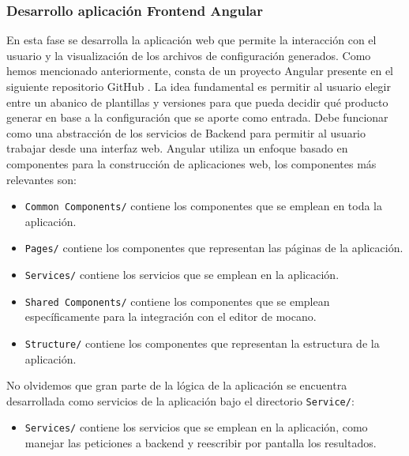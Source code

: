 \documentclass[12pt, a4paper, twoside]{article}
\begin{document}
\subsubsection{Desarrollo aplicación Frontend Angular}
En esta fase se desarrolla la aplicación web que permite la interacción con el usuario y la visualización de los archivos de configuración generados. Como hemos mencionado anteriormente, consta de un proyecto Angular presente en el siguiente repositorio GitHub \cite{m4rdom_frontend}.
La idea fundamental es permitir al usuario elegir entre un abanico de plantillas y versiones para que pueda decidir qué producto generar en base a la configuración que se aporte como entrada.
Debe funcionar como una abstracción de los servicios de Backend para permitir al usuario trabajar desde una interfaz web.
Angular utiliza un enfoque basado en componentes para la construcción de aplicaciones web, los componentes más relevantes son:
\begin{itemize}
	\item \texttt{Common Components/} contiene los componentes que se emplean en toda la aplicación.
	\item \texttt{Pages/} contiene los componentes que representan las páginas de la aplicación.
	\item \texttt{Services/} contiene los servicios que se emplean en la aplicación.
	\item \texttt{Shared Components/} contiene los componentes que se emplean específicamente para la integración con el editor de mocano.
	\item \texttt{Structure/} contiene los componentes que representan la estructura de la aplicación.
\end{itemize}

No olvidemos que gran parte de la lógica de la aplicación se encuentra desarrollada como servicios de la aplicación bajo el directorio \texttt{Service/}: 

\begin{itemize}
	\item \texttt{Services/} contiene los servicios que se emplean en la aplicación, como manejar las peticiones a backend y reescribir por pantalla los resultados.
\end{itemize}
\end{document}
